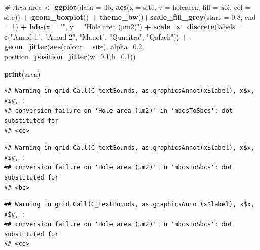 \documentclass[
]{article}
\newenvironment{Shaded}{\begin{snugshade}}{\end{snugshade}}
\newcommand{\AttributeTok}[1]{\textcolor[rgb]{0.13,0.29,0.53}{#1}}
\newcommand{\CommentTok}[1]{\textcolor[rgb]{0.56,0.35,0.01}{\textit{#1}}}
\newcommand{\DecValTok}[1]{\textcolor[rgb]{0.00,0.00,0.81}{#1}}
\newcommand{\FloatTok}[1]{\textcolor[rgb]{0.00,0.00,0.81}{#1}}
\newcommand{\FunctionTok}[1]{\textcolor[rgb]{0.13,0.29,0.53}{\textbf{#1}}}
\newcommand{\NormalTok}[1]{#1}
\newcommand{\OtherTok}[1]{\textcolor[rgb]{0.56,0.35,0.01}{#1}}
\newcommand{\SpecialCharTok}[1]{\textcolor[rgb]{0.81,0.36,0.00}{\textbf{#1}}}
\newcommand{\StringTok}[1]{\textcolor[rgb]{0.31,0.60,0.02}{#1}}
\begin{document}
\begin{Shaded}
\begin{Highlighting}[]
\CommentTok{\# Area}
\NormalTok{area }\OtherTok{\textless{}{-}} \FunctionTok{ggplot}\NormalTok{(}\AttributeTok{data =}\NormalTok{ db, }\FunctionTok{aes}\NormalTok{(}\AttributeTok{x =}\NormalTok{ site, }\AttributeTok{y =}\NormalTok{ holearea, }\AttributeTok{fill =}\NormalTok{ aoi, }\AttributeTok{col =}\NormalTok{ site)) }\SpecialCharTok{+}  
           \FunctionTok{geom\_boxplot}\NormalTok{() }\SpecialCharTok{+}
           \FunctionTok{theme\_bw}\NormalTok{()}\SpecialCharTok{+}\FunctionTok{scale\_fill\_grey}\NormalTok{(}\AttributeTok{start =} \FloatTok{0.8}\NormalTok{, }\AttributeTok{end =} \DecValTok{1}\NormalTok{) }\SpecialCharTok{+}
           \FunctionTok{labs}\NormalTok{(}\AttributeTok{x =} \StringTok{""}\NormalTok{, }\AttributeTok{y =} \StringTok{"Hole area (μm2)"}\NormalTok{) }\SpecialCharTok{+}
           \FunctionTok{scale\_x\_discrete}\NormalTok{(}\AttributeTok{labels =} \FunctionTok{c}\NormalTok{(}\StringTok{"Amud 1"}\NormalTok{, }\StringTok{"Amud 2"}\NormalTok{, }\StringTok{"Manot"}\NormalTok{, }\StringTok{"Quneitra"}\NormalTok{, }\StringTok{"Qafzeh"}\NormalTok{)) }\SpecialCharTok{+}
           \FunctionTok{geom\_jitter}\NormalTok{(}\FunctionTok{aes}\NormalTok{(}\AttributeTok{colour =}\NormalTok{ site), }\AttributeTok{alpha=}\FloatTok{0.2}\NormalTok{, }\AttributeTok{position=}\FunctionTok{position\_jitter}\NormalTok{(}\AttributeTok{w=}\FloatTok{0.1}\NormalTok{,}\AttributeTok{h=}\FloatTok{0.1}\NormalTok{)) }

\FunctionTok{print}\NormalTok{(area)}
\end{Highlighting}
\end{Shaded}

\begin{verbatim}
## Warning in grid.Call(C_textBounds, as.graphicsAnnot(x$label), x$x, x$y, :
## conversion failure on 'Hole area (μm2)' in 'mbcsToSbcs': dot substituted for
## <ce>
\end{verbatim}

\begin{verbatim}
## Warning in grid.Call(C_textBounds, as.graphicsAnnot(x$label), x$x, x$y, :
## conversion failure on 'Hole area (μm2)' in 'mbcsToSbcs': dot substituted for
## <bc>
\end{verbatim}

\begin{verbatim}
## Warning in grid.Call(C_textBounds, as.graphicsAnnot(x$label), x$x, x$y, :
## conversion failure on 'Hole area (μm2)' in 'mbcsToSbcs': dot substituted for
## <ce>
\end{verbatim}
\end{document}
